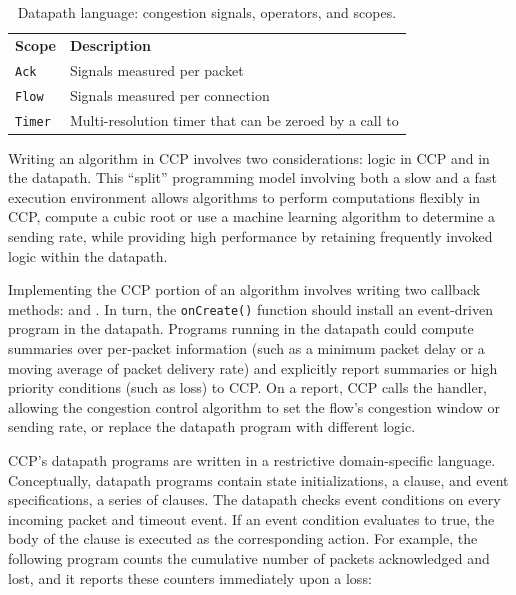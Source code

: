 \begin{table}
\begin{tabular}{p{}p{}}
        \hline
        \hline
        \textbf{Scope} & \textbf{Description} \\
        \texttt{Ack} & Signals measured per packet \\
        \texttt{Flow} & Signals measured per connection \\
        \texttt{Timer} & Multi-resolution timer that can be zeroed by a call to \ct{reset} \\
    \end{tabular}
    \caption{Datapath language: congestion signals, operators, and scopes.}\label{tab:api}
\end{table}

Writing an algorithm in CCP involves two considerations: logic in CCP and in the datapath.
This ``split'' programming model involving both a slow and a fast execution environment allows
algorithms to perform computations flexibly in CCP, \eg compute a cubic
root or use a machine learning algorithm to determine a sending rate, while
providing high performance by retaining frequently invoked logic within
the datapath.

Implementing the CCP portion of an algorithm involves writing two callback methods:
 and .
In turn, the \texttt{onCreate()} function should install an
event-driven program in the datapath.
Programs running in the datapath could compute summaries over per-packet
information (such as a minimum packet delay or a moving average of packet
delivery rate) and explicitly report summaries or high priority conditions
(such as loss) to CCP.
On a report, CCP calls the  handler,
allowing the congestion control algorithm to set the flow's congestion
window or sending rate, or replace the datapath program with different logic.

 CCP's datapath programs are written in a restrictive
domain-specific language.
Conceptually, datapath programs contain state initializations, \ie a 
clause, and event specifications, \ie a series of  clauses.
The datapath checks event conditions on every incoming packet and timeout event.
If an event condition evaluates to true, the body of the  clause is executed as the corresponding
action.
For example, the following program counts the cumulative
number of packets acknowledged and lost, and it reports these counters immediately upon a loss:

